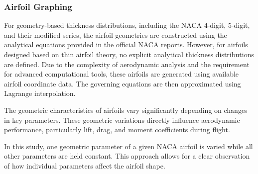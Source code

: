\subsubsection*{Airfoil Graphing}

For geometry-based thickness distributions, 
including the NACA 4-digit, 5-digit, and their modified series, 
the airfoil geometries are constructed using the analytical equations provided in the official NACA reports.
However, for airfoils designed based on thin airfoil theory, 
no explicit analytical thickness distributions are defined. 
Due to the complexity of aerodynamic analysis and the requirement for advanced computational tools, 
these airfoils are generated using available airfoil coordinate data. 
The governing equations are then approximated using Lagrange interpolation.

The geometric characteristics of airfoils vary significantly depending on changes in key parameters. 
These geometric variations directly influence aerodynamic performance, particularly lift, drag, and moment coefficients during flight.

In this study, 
one geometric parameter of a given NACA airfoil is varied while all other parameters are held constant. 
This approach allows for a clear observation of how individual parameters affect the airfoil shape.
